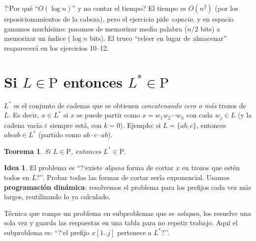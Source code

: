 \documentclass[11pt,a4paper]{article}
\theoremstyle{plain}
\newtheorem{teorema}{Teorema}
\theoremstyle{definition}
\newtheorem*{idea}{Idea}
\newcommand{\Pclass}{\mathrm{P}}
\newcommand{\Lstar}{L^{*}}
\begin{document}
\begin{porque}
?`Por qu\'e ``$O(\log n)$'' y no contar el tiempo? El tiempo es $O(n^2)$ (por los
reposicionamientos de la cabeza), pero el ejercicio pide \emph{espacio}, y en espacio
ganamos much\'isimo: pasamos de memorizar media palabra ($n/2$ bits) a memorizar un
\'indice ($\log n$ bits). El truco ``releer en lugar de almacenar'' reaparecer\'a en
los ejercicios 10--12.
\end{porque}

\section{Si $L\in\Pclass$ entonces $\Lstar\in\Pclass$}

\begin{concepto}[La estrella de Kleene $\Lstar$]
$\Lstar$ es el conjunto de cadenas que se obtienen \emph{concatenando cero o m\'as}
trozos de $L$. Es decir, $x\in\Lstar$ si $x$ se puede partir como
$x=w_1 w_2\cdots w_k$ con cada $w_j\in L$ (y la cadena vac\'ia $\varepsilon$ siempre
est\'a, con $k=0$). Ejemplo: si $L=\{ab,c\}$, entonces $abcab\in\Lstar$ (partido como
$ab\cdot c\cdot ab$).
\end{concepto}

\begin{teorema}
Si $L\in\Pclass$, entonces $\Lstar\in\Pclass$.
\end{teorema}

\begin{idea}
El problema es ``?`existe \emph{alguna} forma de cortar $x$ en trozos que est\'en
todos en $L$?''. Probar todas las formas de cortar ser\'ia exponencial. Usamos
\textbf{programaci\'on din\'amica}: resolvemos el problema para los prefijos cada vez
m\'as largos, reutilizando lo ya calculado.
\end{idea}

\begin{concepto}
T\'ecnica que rompe un problema en subproblemas que se \emph{solapan}, los resuelve
una sola vez y guarda las respuestas en una tabla para no repetir trabajo. Aqu\'i el
subproblema es: ``?`el prefijo $x[1..j]$ pertenece a $\Lstar$?''.
\end{concepto}
\end{document}

